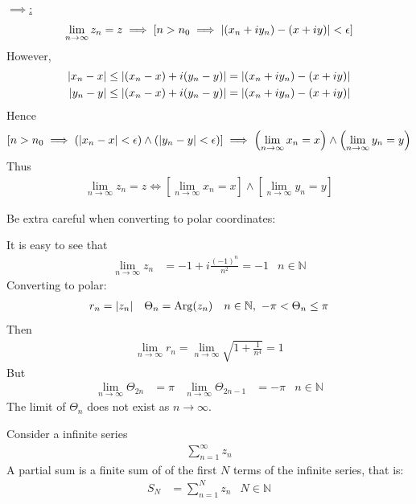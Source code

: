 \documentclass[12pt, english]{book}
\makeatletter
\DeclareMathOperator\Arg{Arg}
\renewenvironment{proof}[1][\proofname]{\par
	\pushQED{\qed}%
	\normalfont \topsep6\p@\@plus6\p@\relax
	\list{}{%
		\settowidth{\leftmargin}{\itshape\proofname:\hskip\labelsep}%
		\setlength{\labelwidth}{0pt}%
		\setlength{\itemindent}{-\leftmargin}%
		}%
	\item[\hskip\labelsep\itshape#1\@addpunct{:}]\ignorespaces
	}{\popQED\endlist\@endpefalse}
\makeatother
\begin{document}
\begin{proof}
		\underline{\(\implies\):} 
		\begin{align*}
			\lim_{n \rightarrow \infty} z_n = z 
			\implies \left[n > n_0 \implies \abs{(x_n + iy_n) - (x + iy)} < \epsilon \right]
		\end{align*}
		However,
		\begin{align*}
			\abs{x_n - x} &\leq \abs{(x_n - x) + i(y_n - y)} = \abs{(x_n + iy_n) - (x + iy)}  \\
			\abs{y_n - y} &\leq \abs{(x_n - x) + i(y_n - y)} = \abs{(x_n + iy_n) - (x + iy)} 
		\end{align*}
		Hence 
		\begin{align*}
			\left[ 
			n > n_0 
			\implies\left(\abs{x_n - x} < \epsilon \right)
				\land \left(\abs{y_n - y} < \epsilon \right)
			\right]
			\implies \left(\lim_{n \rightarrow \infty} x_n = x \right)
				\land \left(\lim_{n \rightarrow \infty} y_n = y \right)
		\end{align*}
		Thus 
		\begin{align*}
			\lim_{n \rightarrow \infty} z_n = z 
			\iff \left[\lim_{n \rightarrow \infty} x_n = x \right] \land 
			\left[\lim_{n \rightarrow \infty} y_n = y \right] 
		\end{align*}
	\end{proof}

	Be extra careful when converting to polar coordinates:
	\begin{example}
		It is easy to see that 
		\begin{align*}
			\lim_{n \rightarrow \infty}
			z_n &= -1 + i \frac{(-1)^n}{n^2} = -1 & n \in \mathbb{N}
		\end{align*}
		Converting to polar: 
		\begin{align*}
			r_n &= \abs{z_n} & \Theta_n &= \Arg(z_n) 
				& n \in \mathbb{N}, \ -\pi < \Theta_n \leq \pi
		\end{align*}
		Then 
		\begin{align*}
			\lim_{n \rightarrow \infty} r_n = \lim_{n \rightarrow \infty} \sqrt{1 + \frac{1}{n^4}} = 1
		\end{align*}
		But
		\begin{align*}
			\lim_{n \rightarrow \infty} \Theta_{2n} &= \pi &
			\lim_{n \rightarrow \infty} \Theta_{2n-1} &= -\pi
				& n \in \mathbb{N}
		\end{align*}
		The limit of \(\Theta_n\) does not exist as \(n \rightarrow \infty\).
	\end{example}

	\begin{definition}
		\label{Partial Sum (Series) Definition - Complex}
		Consider a infinite series
		\begin{align*}
			\sum_{n=1}^{\infty} z_n
		\end{align*}
		A partial sum is a finite sum of of the first \(N\) terms of the infinite series, that is:
		\begin{align*}
			S_N &= \sum_{n=1}^{N} z_n & N \in \mathbb{N}
		\end{align*}
	\end{definition}
	
\end{document}
